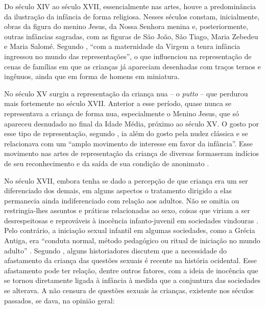 
Do século XIV ao século XVII, essencialmente nas artes, houve a predominância da ilustração da infância de forma religiosa. Nesses séculos constam, inicialmente, obras da figura do menino Jesus, da Nossa Senhora menina e, posteriormente, outras infâncias sagradas, com as figuras de São João, São Tiago, Maria Zebedeu e Maria Salomé. Segundo , ``com a maternidade da Virgem a tenra infância ingressou no mundo das representações'', o que influenciou na representação de cenas de famílias em que as crianças já apareciam desenhadas com traços ternos e ingênuos, ainda que em forma de homens em miniatura. 

No século XV surgiu a representação da criança nua -- o \emph{putto} -- que perdurou mais fortemente no século XVII. Anterior a esse período, quase nunca se representava a criança de forma nua, especialmente o Menino Jesus, que só apareceu desnudado no final da Idade Média, próximo ao século XV. O gosto por esse tipo de representação, segundo , ia além do gosto pela nudez clássica e se relacionava com um ``amplo movimento de interesse em favor da infância''. Esse movimento nas artes de representação da criança de diversas formas\footnotemark eram indícios de seu reconhecimento e da saída de sua condição de anonimato \cite{ARIES1981}.


No século XVII, embora tenha se dado a percepção de que criança era um ser diferenciado dos demais, em alguns aspectos o tratamento dirigido a elas permanecia ainda indiferenciado com relação aos adultos. Não se omitia ou restringia-lhes assuntos e práticas relacionadas ao sexo, coisas que viriam a ser desrespeitosas e reprováveis à inocência infanto-juvenil em sociedades vindouras \cite{MOTT1998}. Pelo contrário, a iniciação sexual infantil em algumas sociedades, como a Grécia Antiga, era ``conduta normal, método pedagógico ou ritual de iniciação no mundo adulto'' . Segundo , alguns historiadores discutem que a necessidade do afastamento da criança das questões sexuais é recente na história ocidental. Esse afastamento pode ter relação, dentre outros fatores, com a ideia de inocência que se tornou diretamente ligada à infância à medida que a conjuntura das sociedades se alterava. A não censura de questões sexuais às crianças, existente nos séculos passados, se dava, na opinião geral:

